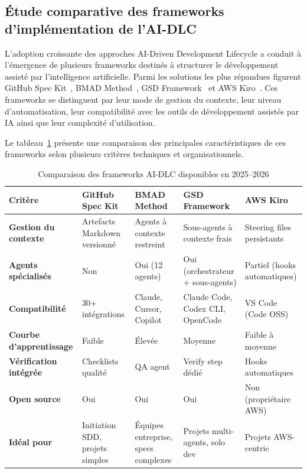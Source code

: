 \subsection{Étude comparative des frameworks d'implémentation de l'AI-DLC}

L'adoption croissante des approches AI-Driven Development Lifecycle a conduit à l'émergence de plusieurs frameworks destinés à structurer le développement assisté par l'intelligence artificielle. Parmi les solutions les plus répandues figurent GitHub Spec Kit~\cite{githubspeckit}, BMAD Method~\cite{bmad2025}, GSD Framework~\cite{gsd2026} et AWS Kiro~\cite{kiro2025}. Ces frameworks se distinguent par leur mode de gestion du contexte, leur niveau d'automatisation, leur compatibilité avec les outils de développement assistés par IA ainsi que leur complexité d'utilisation.

Le tableau~\ref{tab:comparaison-frameworks-ch1} présente une comparaison des principales caractéristiques de ces frameworks selon plusieurs critères techniques et organisationnels.

\begin{table}[H]
\centering
\renewcommand{\arraystretch}{1.4}
\caption{Comparaison des frameworks AI-DLC disponibles en 2025--2026}
\label{tab:comparaison-frameworks-ch1}
\begin{tabular}{|p{3cm}|p{3cm}|p{3cm}|p{3cm}|p{3cm}|}
\hline
\textbf{Critère} & \textbf{GitHub Spec Kit} & \textbf{BMAD Method} & \textbf{GSD Framework} & \textbf{AWS Kiro} \\
\hline

\textbf{Gestion du contexte} & Artefacts Markdown versionné & Agents à contexte restreint & Sous-agents à contexte frais & Steering files persistants \\
\hline
\textbf{Agents spécialisés} & Non & Oui (12 agents) & Oui (orchestrateur + sous-agents) & Partiel (hooks automatiques) \\
\hline
\textbf{Compatibilité} & 30+ intégrations & Claude, Cursor, Copilot & Claude Code, Codex CLI, OpenCode & VS Code (Code OSS) \\
\hline
\textbf{Courbe d'apprentissage} & Faible & Élevée & Moyenne & Faible à moyenne \\
\hline
\textbf{Vérification intégrée} & Checklists qualité & QA agent & Verify step dédié & Hooks automatiques \\
\hline
\textbf{Open source} & Oui & Oui & Oui & Non (propriétaire AWS) \\
\hline
\textbf{Idéal pour} & Initiation SDD, projets simples & Équipes entreprise, specs complexes & Projets multi-agents, solo dev & Projets AWS-centric \\
\hline
\end{tabular}
\end{table}

